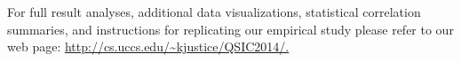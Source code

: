 
For full result analyses, additional data visualizations, statistical correlation summaries, and instructions for replicating
our empirical study please refer to our web page: \url{http://cs.uccs.edu/~kjustice/QSIC2014/.}


